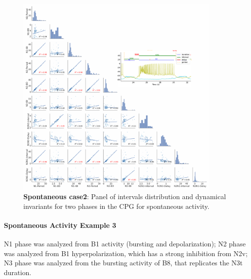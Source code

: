 \begin{figure}[htbp]
\centering
\includegraphics[width=0.9\textwidth]{./invariants/data/SUSSEX/prep2/images/2phases/panel_with_pairplot.pdf}
\caption{\textbf{Spontaneous case2}: Panel of intervals distribution and dynamical invariants for two phases in the CPG for spontaneous activity.}
\label{fig:prep2 2phase invariants pairplot}
\end{figure}


\paragraph{Spontaneous Activity Example 3}
N1 phase was analyzed from B1 activity (bursting and depolarization); N2 phase was analyzed from B1 hyperpolarization, which has a strong inhibition from N2v; N3 phase was analyzed from the bursting activity of B8, that replicates the N3t duration. 

